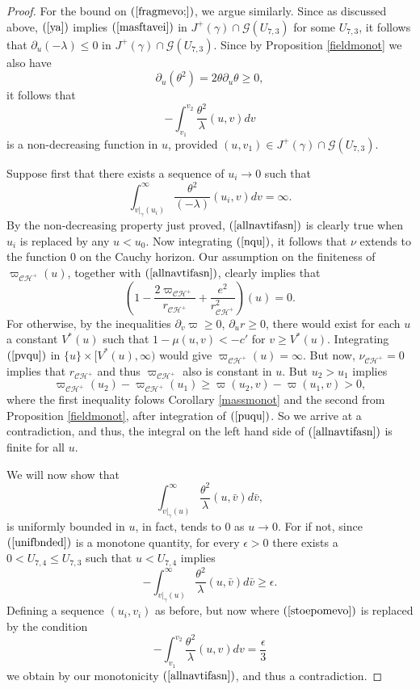 \documentclass{article}
\begin{document}
{\begin{proof}
For the bound on $(\ref{fragmevo;})$, we argue similarly. 
Since as discussed
above, $(\ref{ya})$ implies
$(\ref{masftavei})$ in $J^+(\gamma)\cap\mathcal{G}(U_{7,3})$ 
for some $U_{7,3}$, 
it follows that $\partial_u(-\lambda)\le0$
in $J^+(\gamma)\cap\mathcal{G}(U_{7,3})$.
Since by Proposition \ref{fieldmonot} we also have 
\[
\partial_u(\theta^2)=2\theta\partial_u\theta\ge0,
\]
it follows that
\[
-\int_{v_1}^{v_2}{\frac{\theta^2}\lambda(u,v)dv}
\]
is a non-decreasing function in $u$, provided $(u,v_1)\in 
J^+(\gamma)\cap\mathcal{G}(U_{7,3})$.

Suppose first that there exists a sequence of $u_i\to0$ such that
\begin{equation}
\label{allnavtifasn}
\int_{v|_\gamma(u_i)}^\infty{\frac{\theta^2}{(-\lambda)}(u_i,v)dv}=\infty.
\end{equation}
By the non-decreasing property
just proved, $(\ref{allnavtifasn})$ is clearly true when
$u_i$ is replaced by any $u<u_0$.
Now integrating $(\ref{nqu})$, it follows that $\nu$ extends to 
the function $0$ on the Cauchy horizon. 
Our assumption on the finiteness of $\varpi_{\mathcal{CH}^+}(u)$,
together with $(\ref{allnavtifasn})$,
clearly implies that 
\[
\left(1-\frac{2\varpi_{\mathcal{CH}^+}}{r_{\mathcal{CH}^+}}+\frac{e^2}{r_{\mathcal{CH}^+}^2}
\right)(u)=0.
\]
For otherwise, by the inequalities
$\partial_v\varpi\ge0$, $\partial_ur\ge0$, there would exist for each
$u$ a constant $V^*(u)$ such that $1-\mu(u,v)<-c'$ for 
$v\ge V^*(u)$. Integrating $(\ref{pvqu})$ in $\{u\}\times[V^*(u),\infty)$
would give $\varpi_{\mathcal{CH}^+}(u)=\infty$.  
But now, $\nu_{\mathcal{CH}^+}=0$ implies that
$r_{\mathcal{CH}^+}$ and thus $\varpi_{\mathcal{CH}^+}$ also is constant in $u$.
But $u_2>u_1$ implies
\[
\varpi_{\mathcal{CH}^+}(u_2)-\varpi_{\mathcal{CH}^+}(u_1)\ge
\varpi(u_2,v)-\varpi(u_1,v)>0,
\]
where the first inequality folows Corollary
\ref{massmonot} and the second from Proposition \ref{fieldmonot},
after integration of $(\ref{puqu})$.
So we arrive at a contradiction, and thus, the integral
on the left hand side of $(\ref{allnavtifasn})$ is finite for all $u$.

We will now show that 
\begin{equation}
\label{unifbnded}
\int_{v|_\gamma(u)}^\infty{\frac{\theta^2}\lambda(u,\bar{v})d\bar{v}},
\end{equation}
is uniformly bounded in $u$, in fact, tends to $0$ as $u\to0$.
For if not, since $(\ref{unifbnded})$
is a monotone quantity, for every $\epsilon>0$
there exists a $0<U_{7,4}\le U_{7,3}$ such that $u<U_{7,4}$ implies
\[
-\int_{v|_\gamma(u)}^\infty{\frac{\theta^2}\lambda(u,\bar{v})d\bar{v}}\ge\epsilon.
\]
Defining a sequence $(u_i,v_i)$ as before, but now
where $(\ref{stoepomevo})$ is replaced by the condition
\[
-\int_{v_1}^{v_2}{\frac{\theta^2}\lambda(u,v)dv}=\frac\epsilon3
\]
we obtain by our monotonicity $(\ref{allnavtifasn})$, and thus
a contradiction.


\end{proof}}
\end{document}
